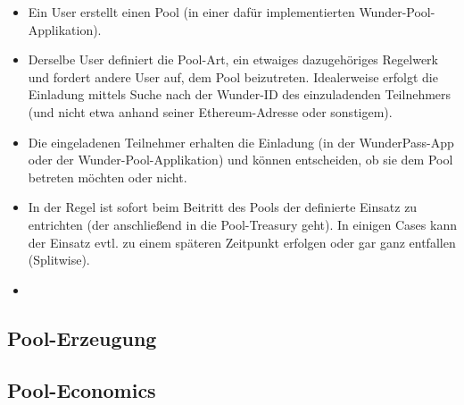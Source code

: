 \begin{itemize}
  \item Ein User erstellt einen Pool (in einer dafür implementierten Wunder-Pool-Applikation).
  \item Derselbe User definiert die Pool-Art, ein etwaiges dazugehöriges Regelwerk und fordert andere User auf, dem Pool beizutreten. Idealerweise erfolgt die Einladung mittels Suche nach der Wunder-ID des einzuladenden Teilnehmers (und nicht etwa anhand seiner Ethereum-Adresse oder sonstigem).
  \item Die eingeladenen Teilnehmer erhalten die Einladung (in der WunderPass-App oder der Wunder-Pool-Applikation) und können entscheiden, ob sie dem Pool betreten möchten oder nicht. 
  \item In der Regel ist sofort beim Beitritt des Pools der definierte Einsatz zu entrichten (der anschließend in die Pool-Treasury geht). In einigen Cases kann der Einsatz evtl. zu einem späteren Zeitpunkt erfolgen oder gar ganz entfallen (Splitwise).
  \item {}
\end{itemize}

\vspace{0.2cm}



\vspace{0.5cm}

\subsection{Pool-Erzeugung}

\vspace{0.3cm}




\vspace{0.5cm}

\subsection{Pool-Economics}

\vspace{0.3cm}



